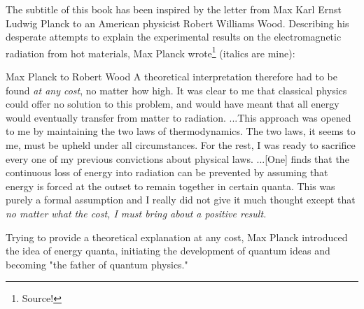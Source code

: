 The subtitle of this book has been inspired by the letter from Max Karl Ernst Ludwig Planck to an American physicist Robert Williams Wood. Describing his desperate attempts to explain the experimental results on the electromagnetic radiation from hot materials, Max Planck wrote\footnote{Source!} (italics are mine):
\begin{mybio}{Max Planck to Robert Wood}
	A theoretical interpretation therefore had to be found {\it at any cost}, no matter how high. It was clear to me that classical physics could offer no solution to this problem, and would have meant that all energy would eventually transfer from matter to radiation. ...This approach was opened to me by maintaining the two laws of thermodynamics. The two laws, it seems to me, must be upheld under all circumstances. For the rest, I was ready to sacrifice every one of my previous convictions about physical laws. ...[One] finds that the continuous loss of energy into radiation can be prevented by assuming that energy is forced at the outset to remain together in certain quanta. This was purely a formal assumption and I really did not give it much thought except that {\it no matter what the cost, I must bring about a positive result.}
	
\end{mybio}
Trying to provide a theoretical explanation at any cost, Max Planck introduced the idea of energy quanta, initiating the development of quantum ideas and becoming "the father of quantum physics."
